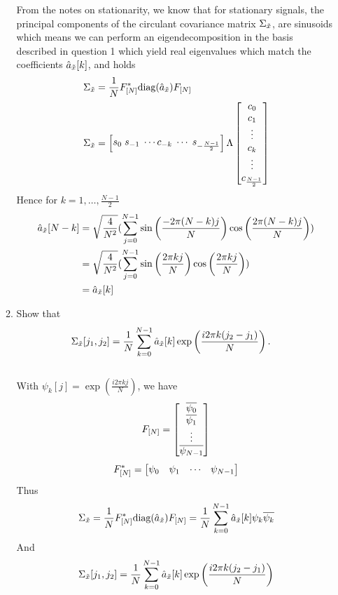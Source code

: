 \documentclass[12pt,twoside]{article}
\begin{document}
\begin{enumerate}
\begin{enumerate}
 From the notes on stationarity, we know that for stationary signals, the principal components  of the circulant covariance matrix $\Sigma_{\tilde{  x }}$, are sinusoids which means we can perform an eigendecomposition
 in the basis described in question 1 which yield real eigenvalues which match the coefficients  $\hat{a}_{\tilde{  x }}[k]$, and holds 
  \begin{align*}
 	\Sigma_{\tilde{  x }}  		&=  \frac{1}{N} F_{[N]}^* \text{diag}(\hat{a}_{\tilde{  x }}) F_{[N]}  \\
 	\Sigma_{\tilde{  x }}  	         &= \begin{bmatrix} s_0 \; s_{-1} \; \cdots c_{-k} \; \cdots \;  s_{-\frac{N-1}{2}}  \end{bmatrix}   \Lambda \begin{bmatrix} c_0 \\ c_1 \\ \vdots \\ c_k \\ \vdots \\ c_ {\frac{N-1}{2}}  \end{bmatrix}  \\
 \end{align*}
 Hence for $k=1,\ldots,\frac{N-1}{2}$
  \begin{align*}
 	 \hat{a}_{\tilde{  x }}[N-k]  		&= 	\sqrt{\frac{4} {N^2}} (\sum_{j=0}^{N-1} \sin \left( \frac{- 2 \pi (N-k) j }{N} \right) \cos \left( \frac{2 \pi (N-k) j }{N} \right) ) \\
	 					&=	\sqrt{\frac{4} {N^2}} (\sum_{j=0}^{N-1} \sin \left( \frac{2 \pi k j }{N} \right) \cos \left( \frac{2 \pi k j }{N} \right) ) \\
						&=	 \hat{a}_{\tilde{  x }}[k] 
 \end{align*}
 
 
 \item Show that
 \begin{align}
 \Sigma_{\tilde{  x }}[j_1,j_2] & = \frac{1}{N}\sum_{k=0}^{N-1} \hat{a}_{\tilde{  x }}[k] \exp\left( \frac{i2 \pi k (j_2-j_1)}{N} \right).
 \end{align}  \\
 With $\psi_{k}[j] = \exp( \frac{i 2 \pi k j}{N} )$, we have 
 $$F_{[N]} = \begin{bmatrix} \overline{\psi_0} \\ \overline{\psi_1} \\ \vdots \\ \overline{\psi_{N-1}} \end{bmatrix}$$
 $$ F_{[N]}^* = \begin{bmatrix} \psi_0 & \psi_1 & \cdots & \psi_{N-1} \end{bmatrix}$$
 Thus
 $$\Sigma_{\tilde{  x }} =  \frac{1}{N} F_{[N]}^* \text{diag}(\hat{a}_{\tilde{  x }}) F_{[N]} =  \frac{1}{N}  \sum_{k=0}^{N-1} \hat{a}_{\tilde{  x }}[k] \psi_{k}  \overline{\psi_k}$$
 And $$\Sigma_{\tilde{  x }}[j_1,j_2] = \frac{1}{N}\sum_{k=0}^{N-1} \hat{a}_{\tilde{  x }}[k] \exp\left( \frac{i2 \pi k (j_2-j_1)}{N} \right)$$
 

\end{enumerate}
\end{enumerate}
\end{document}

